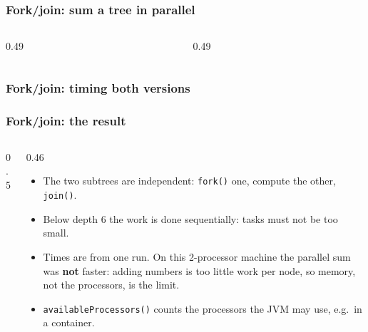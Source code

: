 \documentclass[aspectratio=169,10pt,compress]{beamer}
\begin{document}




\begin{frame}[t,fragile] \frametitle{Fork/join: sum a tree in parallel}
  \begin{columns}[T]
    \begin{column}{0.49\textwidth}
    \end{column}
    \begin{column}{0.49\textwidth}
    \end{column}
  \end{columns}
\end{frame}




\begin{frame}[t,fragile] \frametitle{Fork/join: timing both versions}
\end{frame}




\begin{frame}[t,fragile] \frametitle{Fork/join: the result}
  \begin{columns}[T]
    \begin{column}{0.5\textwidth}
    \end{column}
    \begin{column}{0.46\textwidth}
      \begin{itemize}\small
        \item The two subtrees are independent: \texttt{fork()} one, compute the other, \texttt{join()}.
        \item Below depth 6 the work is done sequentially: tasks must not be too small.
        \item Times are from one run. On this 2-processor machine the parallel sum was \textbf{not} faster: adding numbers is too little work per node, so memory, not the processors, is the limit.
        \item \texttt{availableProcessors()} counts the processors the JVM may use, e.g.\ in a container.
      \end{itemize}
    \end{column}
  \end{columns}
\end{frame}
\end{document}
